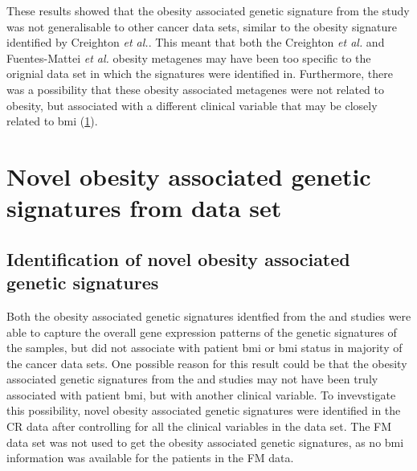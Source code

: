 These results showed that the obesity associated genetic signature from the \citet{Fuentes-Mattei2014} study was not generalisable to other cancer data sets, similar to the obesity signature identified by Creighton \textit{et al.}.
This meant that both the Creighton \textit{et al.} and Fuentes-Mattei \textit{et al.} obesity metagenes may have been too specific to the orignial data set in which the signatures were identified in.
Furthermore, there was a possibility that these obesity associated metagenes were not related to obesity, but associated with a different clinical variable that may be closely related to \gls{bmi} (\cref{sec:creighton_obesity_metagene_new}).

\section{Novel obesity associated genetic signatures from \citet{Creighton2012} data set}
\label{sec:creighton_obesity_metagene_new}

\subsection{Identification of novel obesity associated genetic signatures}
\label{sub:identification_of_obesity_associated_genetic_signatures}

Both the obesity associated genetic signatures identfied from the \citet{Creighton2012} and \citet{Fuentes-Mattei2014} studies were able to capture the overall gene expression patterns  of the genetic signatures of the samples, but did not associate with patient \gls{bmi} or \gls{bmi} status in majority of the cancer data sets.
One possible reason for this result could be that the obesity associated genetic signatures from the \citet{Creighton2012} and \citet{Fuentes-Mattei2014} studies may not have been truly associated with patient \gls{bmi}, but with another clinical variable.
To invevstigate this possibility, novel obesity associated genetic signatures were identified in the CR data after controlling for all the clinical variables in the data set.
The FM data set was not used to get the obesity associated genetic signatures, as no \gls{bmi} information was available for the patients in the FM data.

